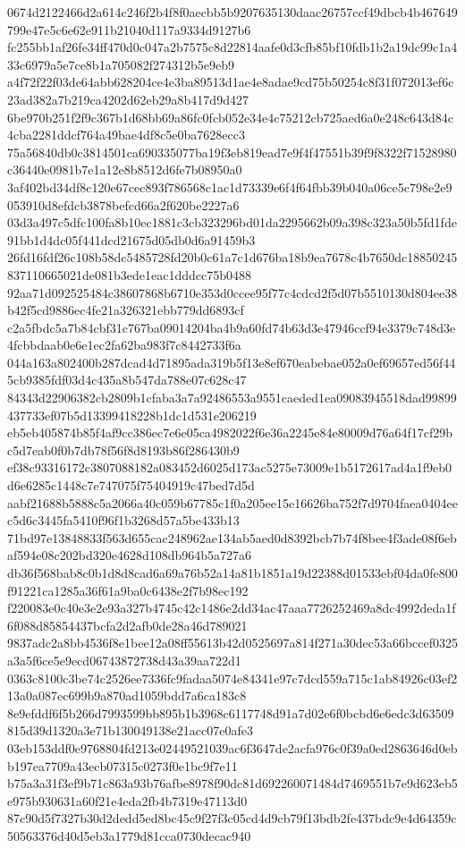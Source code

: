 \documentclass[11pt,a4paper]{article}
\begin{document}
{0674d2122466d2a614c246f2b4f8f0aecbb5b9207635130daac26757ccf49dbcb4b467649799e47e5c6e62e911b21040d117a9334d9127b6
fc255bb1af26fe34ff470d0c047a2b7575c8d22814aafe0d3cfb85bf10fdb1b2a19dc99c1a433c6979a5e7ce8b1a705082f274312b5e9eb9
a4f72f22f03de64abb628204ce4e3ba89513d1ae4e8adae9cd75b50254c8f31f072013ef6c23ad382a7b219ca4202d62eb29a8b417d9d427
6be970b251f2f9c367b1d68bb69a86fc0fcb052e34e4c75212cb725aed6a0e248c643d84c4cba2281ddcf764a49bae4df8c5e0ba7628ecc3
75a56840db0c3814501ca690335077ba19f3eb819ead7e9f4f47551b39f9f8322f71528980c36440e0981b7e1a12e8b8512d6fe7b08950a0
3af402bd34df8c120e67cec893f786568c1ac1d73339e6f4f64fbb39b040a06ce5c798e2e9053910d8efdcb3878befcd66a2f620be2227a6
03d3a497c5dfc100fa8b10ec1881c3cb323296bd01da2295662b09a398c323a50b5fd1fde91bb1d4dc05f441dcd21675d05db0d6a91459b3
26fd16fdf26c108b58dc5485728fd20b0c61a7c1d676ba18b9ea7678c4b7650dc18850245837110665021de081b3ede1eac1dddcc75b0488
92aa71d092525484c38607868b6710e353d0ccee95f77c4cdcd2f5d07b5510130d804ee38b42f5cd9886ec4fe21a326321ebb779dd6893cf
c2a5fbdc5a7b84cbf31c767ba09014204ba4b9a60fd74b63d3e47946ccf94e3379c748d3e4fcbbdaab0e6e1ec2fa62ba983f7c8442733f6a
044a163a802400b287dcad4d71895ada319b5f13e8ef670eabebae052a0ef69657ed56f445cb9385fdf03d4c435a8b547da788e07c628c47
84343d22906382cb2809b1cfaba3a7a92486553a9551caeded1ea09083945518dad99899437733ef07b5d13399418228b1dc1d531e206219
eb5eb405874b85f4af9cc386ec7e6e05ca4982022f6e36a2245e84e80009d76a64f17cf29bc5d7eab0f0b7db78f56f8d8193b86f286430b9
ef38c93316172c3807088182a083452d6025d173ac5275e73009e1b5172617ad4a1f9eb0d6e6285c1448c7e747075f75404919c47bed7d5d
aabf21688b5888c5a2066a40c059b67785c1f0a205ee15e16626ba752f7d9704faea0404eec5d6c3445fa5410f96f1b3268d57a5be433b13
71bd97e13848833f563d655cac248962ae134ab5aed0d8392bcb7b74f8bee4f3ade08f6ebaf594e08c202bd320e4628d108db964b5a727a6
db36f568bab8c0b1d8d8cad6a69a76b52a14a81b1851a19d22388d01533ebf04da0fe800f91221ca1285a36f61a9ba0c6438e2f7b98ec192
f220083e0c40e3e2e93a327b4745c42c1486e2dd34ac47aaa7726252469a8dc4992deda1f6f088d85854437bcfa2d2afb0de28a46d789021
9837adc2a8bb4536f8e1bee12a08ff55613b42d0525697a814f271a30dec53a66bccef0325a3a5f6ce5e9ecd06743872738d43a39aa722d1
0363c8100c3be74c2526ee7336fc9fadaa5074e84341e97c7dcd559a715c1ab84926c03ef213a0a087ec699b9a870ad1059bdd7a6ca183c8
8e9efddf6f5b266d7993599bb895b1b3968c6117748d91a7d02e6f0bcbd6e6edc3d63509815d39d1320a3e71b130049138e21acc07e0afe3
03eb153ddf0e9768804fd213e02449521039ac6f3647de2acfa976c0f39a0ed2863646d0ebb197ea7709a43ecb07315c0273f0e1bc9f7e11
b75a3a31f3ef9b71c863a93b76afbe8978f90dc81d692260071484d7469551b7e9d623eb5e975b930631a60f21e4eda2fb4b7319e47113d0
87c90d5f7327b30d2dedd5ed8bc45c9f27f3c05cd4d9cb79f13bdb2fe437bdc9e4d64359c50563376d40d5eb3a1779d81cca0730decac940
}
\end{document}
